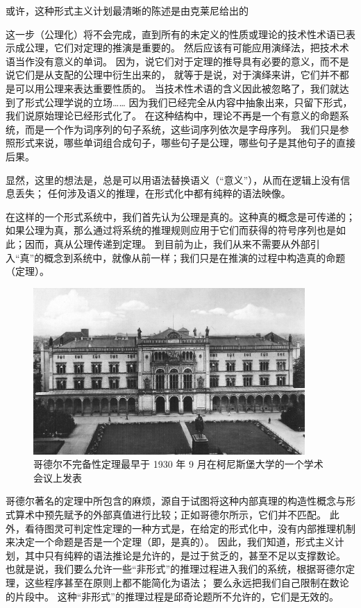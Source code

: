 \documentclass[a4paper,12pt]{article}
\begin{document}
或许，这种形式主义计划最清晰的陈述是由克莱尼给出的\cite{KleeneSC1952}

\begin{displayquote}
这一步（公理化）将不会完成，直到所有的未定义的性质或理论的技术性术语已表示成公理，它们对定理的推演是重要的。
然后应该有可能应用演绎法，把技术术语当作没有意义的单词。
因为，说它们对于定理的推导具有必要的意义，而不是说它们是从支配的公理中衍生出来的，
就等于是说，对于演绎来讲，它们并不都是可以用公理来表达重要性质的。
当技术性术语的含义因此被忽略了，我们就达到了形式公理学说的立场……
因为我们已经完全从内容中抽象出来，只留下形式，我们说原始理论已经形式化了。
在这种结构中，理论不再是一个有意义的命题系统，而是一个作为词序列的句子系统，这些词序列依次是字母序列。
我们只是参照形式来说，哪些单词组合成句子，哪些句子是公理，哪些句子是其他句子的直接后果。
\end{displayquote}

显然，这里的想法是，总是可以用语法替换语义（“意义”），从而在逻辑上没有信息丢失；
任何涉及语义的推理，在形式化中都有纯粹的语法映像。

在这样的一个形式系统中，我们首先认为公理是真的。这种真的概念是可传递的；
如果公理为真，那么通过将系统的推理规则应用于它们而获得的符号序列也是如此；因而，真从公理传递到定理。
到目前为止，我们从来不需要从外部引入“真”的概念到系统中，就像从前一样；我们只是在推演的过程中构造真的命题（定理）。

\begin{figure}[ht]
\centering
\includegraphics[height=2.5in]{images/konigsberger_university.jpg}
\caption{哥德尔不完备性定理最早于 1930 年 9 月在柯尼斯堡大学的一个学术会议上发表}
\end{figure}

哥德尔著名的定理\cite{GodelK1931}中所包含的麻烦，源自于试图将这种内部真理的构造性概念与形式算术中预先赋予的外部真值进行比较；正如哥德尔所示，它们并不匹配。
此外，看待图灵可判定性定理\cite{TuringA1937}的一种方式是，在给定的形式化中，没有内部推理机制来决定一个命题是否是一个定理（即，是真的）。
因此，我们知道，形式主义计划，其中只有纯粹的语法推论是允许的，是过于贫乏的，甚至不足以支撑数论。
也就是说，我们要么允许一些“非形式”的推理过程进入我们的系统，根据哥德尔定理，这些程序甚至在原则上都不能简化为语法； 要么永远把我们自己限制在数论的片段中。
这种“非形式”的推理过程是邱奇论题所不允许的，它们是无效的。
\end{document}
